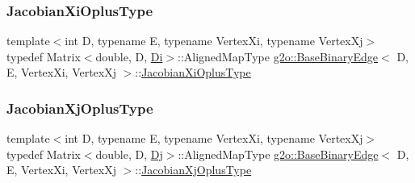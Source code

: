 \mbox{\label{classg2o_1_1_base_binary_edge_ab1cde84224b129603bcd95db027e0167}} 
\subsubsection{\texorpdfstring{Jacobian\+Xi\+Oplus\+Type}{JacobianXiOplusType}}
{\footnotesize\ttfamily template$<$int D, typename E, typename Vertex\+Xi, typename Vertex\+Xj$>$ \\
typedef Matrix$<$double, D, \mbox{\hyperlink{classg2o_1_1_base_binary_edge_abfe232196405a7204bc299a747c1cc8b}{Di}}$>$\+::Aligned\+Map\+Type \mbox{\hyperlink{classg2o_1_1_base_binary_edge}{g2o\+::\+Base\+Binary\+Edge}}$<$ D, E, Vertex\+Xi, Vertex\+Xj $>$\+::\mbox{\hyperlink{classg2o_1_1_base_binary_edge_ab1cde84224b129603bcd95db027e0167}{Jacobian\+Xi\+Oplus\+Type}}}

\mbox{\label{classg2o_1_1_base_binary_edge_a83e5dec2135b33e86255c87be3b5d062}} 
\subsubsection{\texorpdfstring{Jacobian\+Xj\+Oplus\+Type}{JacobianXjOplusType}}
{\footnotesize\ttfamily template$<$int D, typename E, typename Vertex\+Xi, typename Vertex\+Xj$>$ \\
typedef Matrix$<$double, D, \mbox{\hyperlink{classg2o_1_1_base_binary_edge_ab718b94950a34d589371fe6f5583b259}{Dj}}$>$\+::Aligned\+Map\+Type \mbox{\hyperlink{classg2o_1_1_base_binary_edge}{g2o\+::\+Base\+Binary\+Edge}}$<$ D, E, Vertex\+Xi, Vertex\+Xj $>$\+::\mbox{\hyperlink{classg2o_1_1_base_binary_edge_a83e5dec2135b33e86255c87be3b5d062}{Jacobian\+Xj\+Oplus\+Type}}}

\mbox{\label{classg2o_1_1_base_binary_edge_ac1e9249e9906747a6669a9c90013944b}} 
